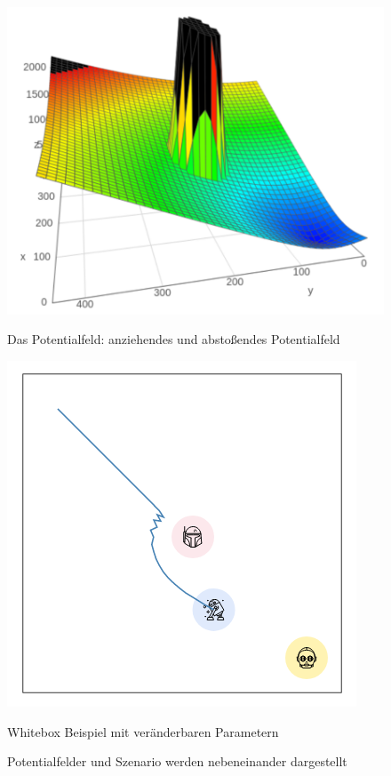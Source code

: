 \begin{figure}
\centering
\begin{minipage}[t]{.48\textwidth}
\centering
\includegraphics[width=0.8\linewidth, height=0.8\linewidth]{img/pot.png}
\caption{Das Potentialfeld: anziehendes und abstoßendes Potentialfeld}\label{fig:surf_pot}
\end{minipage}\hfill
\begin{minipage}[t]{.48\textwidth}
\centering
\includegraphics[width=0.8\linewidth, height=0.8\linewidth]{img/sim1.png}
\caption{Whitebox Beispiel mit veränderbaren Parametern}\label{fig:sw_whitebox}
\end{minipage}
\caption{Potentialfelder und Szenario werden nebeneinander dargestellt}
\label{fig:combi}
\end{figure}

